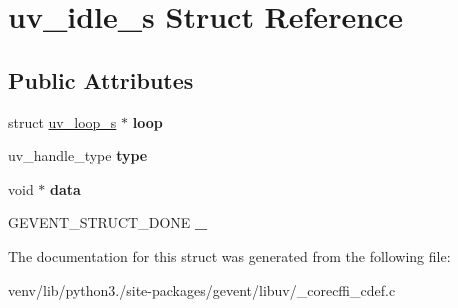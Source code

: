 \hypertarget{structuv__idle__s}{}\section{uv\+\_\+idle\+\_\+s Struct Reference}
\label{structuv__idle__s}
\subsection*{Public Attributes}
\begin{DoxyCompactItemize}
\item 
\mbox{\label{structuv__idle__s_a0bc8e8cc60450cde6362d0d1c3c3e370}} 
struct \hyperlink{structuv__loop__s}{uv\+\_\+loop\+\_\+s} $\ast$ {\bfseries loop}
\item 
\mbox{\label{structuv__idle__s_a7fc713b057d5e7c6191d42f949022901}} 
uv\+\_\+handle\+\_\+type {\bfseries type}
\item 
\mbox{\label{structuv__idle__s_ac32b2b6763bfe941322b7b1941fb0098}} 
void $\ast$ {\bfseries data}
\item 
\mbox{\label{structuv__idle__s_a088af53500d9260039617f3773a03085}} 
G\+E\+V\+E\+N\+T\+\_\+\+S\+T\+R\+U\+C\+T\+\_\+\+D\+O\+NE {\bfseries \+\_\+}
\end{DoxyCompactItemize}


The documentation for this struct was generated from the following file\+:\begin{DoxyCompactItemize}
\item 
venv/lib/python3./site-\/packages/gevent/libuv/\+\_\+corecffi\+\_\+cdef.\+c\end{DoxyCompactItemize}
